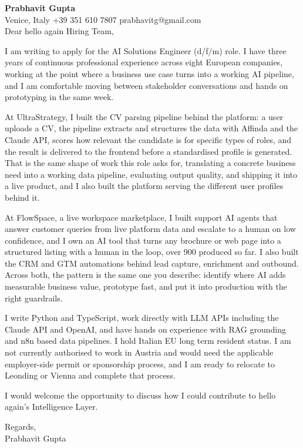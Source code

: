 \documentclass[a4paper,10.5pt]{article}
\begin{document}
\textbf{Prabhavit Gupta}\\
Venice, Italy \textbar{} +39 351 610 7807 \textbar{} prabhavitg@gmail.com\\[10pt]
Dear hello again Hiring Team,

I am writing to apply for the AI Solutions Engineer (d/f/m) role. I have three years of continuous professional experience across eight European companies, working at the point where a business use case turns into a working AI pipeline, and I am comfortable moving between stakeholder conversations and hands on prototyping in the same week.

At UltraStrategy, I built the CV parsing pipeline behind the platform: a user uploads a CV, the pipeline extracts and structures the data with Affinda and the Claude API, scores how relevant the candidate is for specific types of roles, and the result is delivered to the frontend before a standardised profile is generated. That is the same shape of work this role asks for, translating a concrete business need into a working data pipeline, evaluating output quality, and shipping it into a live product, and I also built the platform serving the different user profiles behind it.

At FlowSpace, a live workspace marketplace, I built support AI agents that answer customer queries from live platform data and escalate to a human on low confidence, and I own an AI tool that turns any brochure or web page into a structured listing with a human in the loop, over 900 produced so far. I also built the CRM and GTM automations behind lead capture, enrichment and outbound. Across both, the pattern is the same one you describe: identify where AI adds measurable business value, prototype fast, and put it into production with the right guardrails.

I write Python and TypeScript, work directly with LLM APIs including the Claude API and OpenAI, and have hands on experience with RAG grounding and n8n based data pipelines. I hold Italian EU long term resident status. I am not currently authorised to work in Austria and would need the applicable employer-side permit or sponsorship process, and I am ready to relocate to Leonding or Vienna and complete that process.

I would welcome the opportunity to discuss how I could contribute to hello again's Intelligence Layer.

Regards,\\
Prabhavit Gupta
\end{document}
